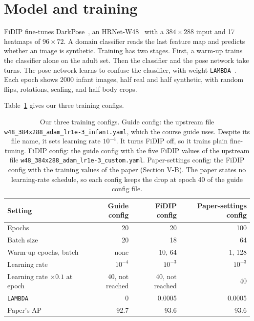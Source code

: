 \documentclass[11pt]{article}
\newcommand{\code}[1]{\texttt{#1}}
\begin{document}
\section{Model and training}

FiDIP fine-tunes DarkPose~\cite{zhang2020dark}, an HRNet-W48~\cite{sun2019hrnet} with a $384\times288$ input and 17 heatmaps of $96\times72$.
A domain classifier reads the last feature map and predicts whether an image is synthetic.
Training has two stages.
First, a warm-up trains the classifier alone on the adult set.
Then the classifier and the pose network take turns.
The pose network learns to confuse the classifier, with weight \code{LAMBDA}~\cite{ganin2015dann}.
Each epoch shows 2000 infant images, half real and half synthetic, with random flips, rotations, scaling, and half-body crops.

Table~\ref{tab:configs} gives our three training configs.

\begin{table}[h]
\centering\small
\begin{tabular}{@{}lrrr@{}}
\toprule
Setting & Guide config & FiDIP config & Paper-settings config \\
\midrule
Epochs & 20 & 20 & 100 \\
Batch size & 20 & 18 & 64 \\
Warm-up epochs, batch & none & 10, 64 & 1, 128 \\
Learning rate & $10^{-4}$ & $10^{-3}$ & $10^{-3}$ \\
Learning rate $\times 0.1$ at epoch & 40, not reached & 40, not reached & 40 \\
\code{LAMBDA} & 0 & 0.0005 & 0.0005 \\
Paper's AP & 92.7 & 93.6 & 93.6 \\
\bottomrule
\end{tabular}
\caption{Our three training configs.
Guide config: the upstream file \code{w48\_384x288\_\allowbreak adam\_lr1e-3\_\allowbreak infant.yaml}, which the course guide uses.
Despite its file name, it sets learning rate $10^{-4}$. It turns FiDIP off, so it trains plain fine-tuning.
FiDIP config: the guide config with the five FiDIP values of the upstream file \code{w48\_384x288\_\allowbreak adam\_lr1e-3\_\allowbreak custom.yaml}.
Paper-settings config: the FiDIP config with the training values of the paper (Section V-B).
The paper states no learning-rate schedule, so each config keeps the drop at epoch 40 of the guide config file.}
\label{tab:configs}
\end{table}
\end{document}

